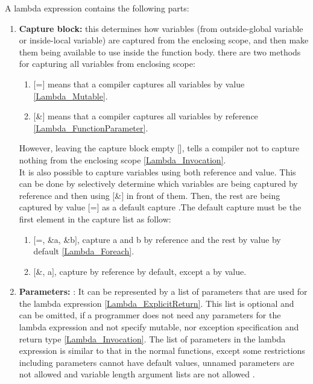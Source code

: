 \documentclass[11pt]{report}
\begin{document}
\begin{enumerate}
A lambda expression contains the following parts:
\begin{enumerate}
\item \textbf{Capture block:} this determines how variables (from outside-global variable or inside-local variable) are captured from the enclosing scope, and then make them being available to use inside the function body. there are two methods for capturing all variables from enclosing scope:

      \begin{enumerate}
      \item $[$=$]$ means that a compiler captures all variables by value \ref{Lambda_Mutable}.
      \item $[$\&$]$ means that a compiler captures all variables by reference 
             \ref{Lambda_FunctionParameter}.
      \end{enumerate}
      However, leaving the capture block empty [], tells a compiler not to capture nothing from the enclosing scope \ref{Lambda_Invocation}. \\
      It is also possible to capture variables using both reference and value. This can be done by selectively determine which variables are being captured by reference and then using $[$\&$]$ in front of them. Then, the rest are being captured by value $[$=$]$ as a default capture \cite{Gregorie:professionalcpp}.The default capture must be the first element in the capture list as follow:
      \begin{enumerate}
      \item $[$=, \&a, \&b$]$, capture a and b by reference and the rest by value by default \ref{Lambda_Foreach}.
      \item $[$\&, a$]$, capture by reference by default, except a by value.
      \end{enumerate}
      
      
\item \textbf{Parameters:} : It can be represented by a list of parameters that are used for the lambda expression \ref{Lambda_ExplicitReturn}. This list is optional and can be omitted, if a programmer does not need any parameters for the lambda expression and not specify mutable, nor exception specification and return type \ref{Lambda_Invocation}. The list of parameters in the lambda expression is similar to that in the normal functions, except some restrictions including parameters cannot have default values, unnamed parameters are not allowed and variable length argument lists are not allowed \cite{Cppreference:2012:Cpp11}.


\end{enumerate}
\end{enumerate}
\end{document}
